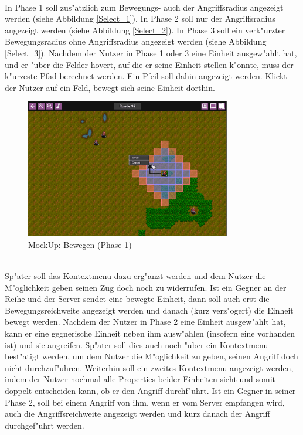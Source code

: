\documentclass[12pt, titlepage]{scrartcl}
\newcounter{subsubsubsection}[subsubsection]
\begin{document}
		            \ \\ In Phase 1 soll zus"atzlich zum Bewegungs- auch der Angriffsradius angezeigt werden (siehe Abbildung \ref{Select_1}). In Phase 2 soll nur der Angriffsradius angezeigt werden (siehe Abbildung \ref{Select_2}). In Phase 3 soll ein verk"urzter Bewegungsradius ohne Angriffsradius angezeigt werden (siehe Abbildung \ref{Select_3}).
                    Nachdem der Nutzer in Phase 1 oder 3 eine Einheit ausgew"ahlt hat, und er "uber die Felder hovert, auf die er seine Einheit stellen k"onnte, muss der k"urzeste Pfad berechnet werden. Ein Pfeil soll dahin angezeigt werden. Klickt der Nutzer auf ein Feld, bewegt sich seine Einheit dorthin. \\
                    \begin{figure}[H] 
    				    \centering
    				    \includegraphics[width=0.8\textwidth]{images/mockUps/Move.png}
    				    \caption{MockUp: Bewegen (Phase 1)}
    				    \label{Move}
			        \end{figure}
                    \ \\ Sp"ater soll das Kontextmenu dazu erg"anzt werden und dem Nutzer die M"oglichkeit geben seinen Zug doch noch zu widerrufen. Ist ein Gegner an der Reihe und der Server sendet eine bewegte Einheit, dann soll auch erst die Bewegungsreichweite angezeigt werden und danach (kurz verz"ogert) die Einheit bewegt werden.
			        Nachdem der Nutzer in Phase 2 eine Einheit ausgew"ahlt hat, kann er eine gegnerische Einheit neben ihm ausw"ahlen (insofern eine vorhanden ist) und sie angreifen. Sp"ater soll dies auch noch "uber ein Kontextmenu best"atigt werden, um dem Nutzer die M"oglichkeit zu geben, seinen Angriff doch nicht durchzuf"uhren. Weiterhin soll ein zweites Kontextmenu angezeigt werden, indem der Nutzer nochmal alle Properties beider Einheiten sieht und somit doppelt entscheiden kann, ob er den Angriff durchf"uhrt. Ist ein Gegner in seiner Phase 2, soll bei einem Angriff von ihm, wenn er vom Server empfangen wird, auch die Angriffsreichweite angezeigt werden und kurz danach der Angriff durchgef"uhrt werden.
\end{document}
